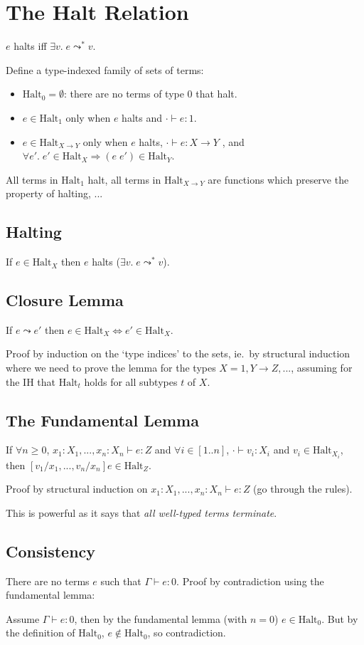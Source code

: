 \documentclass[a4paper,11pt]{article}
\begin{document}
\section{The Halt Relation}
{
    \(e\) halts iff \(\exists v.\; e \leadsto^* v\).

    Define a type-indexed family of sets of terms: 
    \begin{itemize}
    \item \(\text{Halt}_0 = \emptyset\): there are no terms of type \(0\) that halt.
    \item \(e \in \text{Halt}_1\) only when \(e\) halts and \(\cdot \vdash e : 1\).
    \item \(e \in \text{Halt}_{X \rightarrow Y}\) only when \(e\) halts, \(\cdot \vdash e : X \rightarrow Y\) , and
    \(\forall e'.\; e' \in \text{Halt}_X \Longrightarrow (e\;e') \in \text{Halt}_Y\).
    \end{itemize}

    All terms in \(\text{Halt}_1\) halt, all terms in \(\text{Halt}_{X \rightarrow Y}\) are functions which preserve the
    property of halting, ...

    \subsection*{Halting}
    {
        If \(e\in\text{Halt}_X\) then \(e\) halts (\(\exists v.\;e \leadsto^* v\)).

    }
    \subsection*{Closure Lemma}
    {
        If \(e \leadsto e'\) then \(e \in \text{Halt}_X \Longleftrightarrow e' \in \text{Halt}_X\).
        
        Proof by induction on the `type indices' to the sets, ie.\ by structural induction where we need to prove the
        lemma for the types \(X = 1, Y \rightarrow Z, ...\), assuming for the IH that \(\text{Halt}_t\) holds for all
        subtypes \(t\) of \(X\).
    }
    \subsection*{The Fundamental Lemma}
    {
        If \(\forall n \geq 0\), \(x_1:X_1,...,x_n:X_n \vdash e : Z\) and \(\forall i\in[1..n]\), \(\cdot\vdash
        v_i:X_i\) and \(v_i \in \text{Halt}_{X_i}\), then \([v_1/x_1,...,v_n/x_n]e \in \text{Halt}_Z\).

        Proof by structural induction on \(x_1:X_1,...,x_n:X_n \vdash e : Z\) (go through the rules).

        This is powerful as it says that \textit{all well-typed terms terminate}.
    }
    \subsection*{Consistency}
    {
        There are no terms \(e\) such that \(\Gamma\vdash e : 0\). Proof by contradiction using the fundamental lemma:

        Assume \(\Gamma\vdash e : 0\), then by the fundamental lemma (with \(n=0\)) \(e \in \text{Halt}_0\). But by the
        definition of \(\text{Halt}_0\), \(e\notin\text{Halt}_0\), so contradiction.
    }
}
\end{document}
